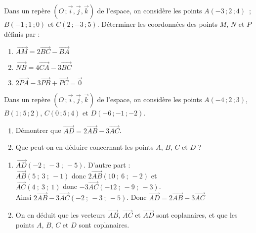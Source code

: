 \documentclass{cornouaille}
\begin{document}
\begin{colonne*exercice}
\begin{exercice}
  Dans un repère $(O\,;\vec{i},\vec{j},\vec{k})$ de l'espace, on
  considère les points $A(-3\,;2\,;4)$ \,; $B(-1\,;1\,;0)$ et
  $C(2\,;-3\,;5)$.  Déterminer les coordonnées des points $M$, $N$ et
  $P$ définis par :
  \begin{enumerate}
  \item $\overrightarrow{AM}=2\overrightarrow{BC}-\overrightarrow{BA}$
  \item
    $\overrightarrow{NB}=4\overrightarrow{CA}-3\overrightarrow{BC}$
  \item
    $2\overrightarrow{PA}-3\overrightarrow{PB}+\overrightarrow{PC}=\overrightarrow{0}$
  \end{enumerate}
\end{exercice}

\columnbreak

\begin{exercice*}\label{ex41G2}
  Dans un repère $(O\,;\vec{i},\vec{j},\vec{k})$ de l'espace, on
  considère les points $A(-4\,;2\,;3)$, $B(1\,;5\,;2)$, $C(0\,;5\,;4)$ et
  $D(-6\,;-1\,;-2)$.
  \begin{enumerate}
  \item Démontrer que
    $\overrightarrow{AD}=2\overrightarrow{AB}-3\overrightarrow{AC}$.
  \item Que peut-on en déduire concernant les points $A$, $B$, $C$ et
    $D$ ?
  \end{enumerate}
\end{exercice*}
\begin{corrige}
  \begin{enumerate}
\item $\overrightarrow{AD}(-2\ ;\ -3\ ;\ -5)$. D'autre part : \\ $\overrightarrow{AB}(5\ ;\ 3\ ;\ -1)$ donc $2\overrightarrow{AB}(10\ ;\ 6\ ;\ -2)$ et \\
$\overrightarrow{AC}(4\ ;\ 3\ ;\ 1)$ donc $-3\overrightarrow{AC}(-12\ ;\ -9\ ;\ -3)$.\\
Ainsi $2\overrightarrow{AB}-3\overrightarrow{AC}(-2\ ;\ -3\ ;\ -5)$.
Donc $\overrightarrow{AD}=2\overrightarrow{AB}-3\overrightarrow{AC}$
\item On en déduit que les vecteurs $\overrightarrow{AB}$, $\overrightarrow{AC}$ et $\overrightarrow{AD}$ sont coplanaires, et que les points $A$, $B$, $C$ et $D$ sont coplanaires.
 \end{enumerate}
\end{corrige}


\end{colonne*exercice}
\end{document}
